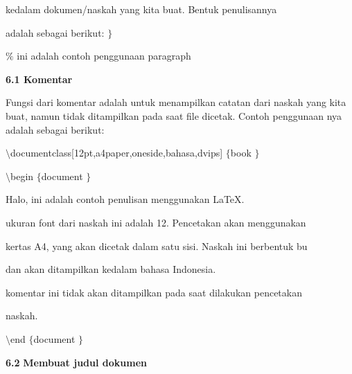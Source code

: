 {\fontsize{10pt}{10pt}\selectfont  \hspace*{0.64in}  \hspace*{0.64in}  \hspace*{0.64in} kedalam dokumen/naskah yang kita buat. Bentuk penulisannya }
 \par
{\fontsize{10pt}{10pt}\selectfont  \hspace*{0.64in}  \hspace*{0.64in}  \hspace*{0.64in} adalah sebagai berikut: $  \}  $}
 \par
{\fontsize{10pt}{10pt}\selectfont   \hspace*{0.64in}  \hspace*{0.64in}  \hspace*{0.64in}  \hspace*{0.64in}  $  \%  $ ini adalah contoh penggunaan paragraph}
 \par
\vspace{10pt}
\textbf{6.1 Komentar}
 \par
Fungsi dari komentar adalah untuk menampilkan catatan dari naskah yang kita buat, namun tidak ditampilkan pada saat file dicetak. Contoh penggunaan nya adalah sebagai berikut:
 \par
{\fontsize{10pt}{10pt}\selectfont  $  \setminus  $documentclass[12pt,a4paper,oneside,bahasa,dvips] $  \{  $book $  \}  $}
 \par
{\fontsize{10pt}{10pt}\selectfont  $  \setminus  $begin $  \{  $document $  \}  $}
 \par
{\fontsize{10pt}{10pt}\selectfont Halo, ini adalah contoh penulisan menggunakan LaTeX.}
 \par
{\fontsize{10pt}{10pt}\selectfont ukuran font dari naskah ini adalah 12. Pencetakan akan menggunakan}
 \par
{\fontsize{10pt}{10pt}\selectfont kertas A4, yang akan dicetak dalam satu sisi. Naskah ini berbentuk bu}
 \par
{\fontsize{10pt}{10pt}\selectfont dan akan ditampilkan kedalam bahasa Indonesia.}
 \par
{\fontsize{10pt}{10pt}\selectfont komentar ini tidak akan ditampilkan pada saat dilakukan pencetakan}
 \par
{\fontsize{10pt}{10pt}\selectfont naskah.}
 \par
{\fontsize{10pt}{10pt}\selectfont  $  \setminus  $end $  \{  $document $  \}  $}
 \par
\vspace{10pt}
\textbf{6.2 }\textbf{Membuat judul dokumen}
